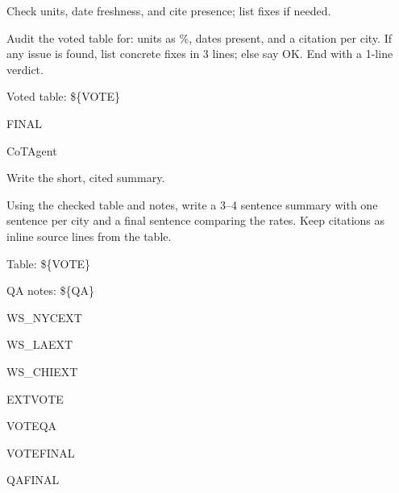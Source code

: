 \begin{userprompt}[title={User Prompt}]
\quad{}
Check units, date freshness, and cite presence; list fixes if needed.

\quad{}

\qquad{}
Audit the voted table for: units as \%, dates present, and a citation per city. If any issue is found, list concrete fixes in 3 lines; else say OK. End with a 1-line verdict.

Voted table:
\$\{VOTE\}

\quad{}



\quad{}FINAL

\quad{}CoTAgent

\quad{}
Write the short, cited summary.

\quad{}

\qquad{}
Using the checked table and notes, write a 3--4 sentence summary with one sentence per city and a final sentence comparing the rates. Keep citations as inline source lines from the table.

Table:
\$\{VOTE\}

QA notes:
\$\{QA\}

\quad{}



\quad{}WS\_NYCEXT

\quad{}WS\_LAEXT

\quad{}WS\_CHIEXT

\quad{}EXTVOTE

\quad{}VOTEQA

\quad{}VOTEFINAL

\quad{}QAFINAL

\\



\end{userprompt}
